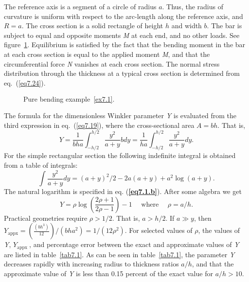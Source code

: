 \documentclass{AeroStructure-ERJohnson}
\begin{document}
\begin{example}\label{ex7.1}The reference axis is a segment of a circle of radius $a$. Thus, the radius of curvature is uniform with respect to the arc-length along the reference axis, and $R=a$. The cross section is a solid rectangle of height $h$ and width $b$. The bar is subject to equal and opposite moments \textit{M} at each end, and no other loads. See figure~\ref{fig7.3}. Equilibrium is satisfied by the fact that the bending moment in the bar at each cross section is equal to the applied moment \textit{M}, and that the circumferential force \textit{N} vanishes at each cross section. The normal stress distribution through the thickness at a typical cross section is determined from eq.~(\ref{eq7.24}).

{\def\thefigure{7.3}
\begin{figure}[h]
\caption{Pure bending example~\ref{ex7.1}.\label{fig7.3}}
\end{figure}}
\vspace*{-1\baselineskip}


The formula for the dimensionless Winkler parameter \textit{Y} is evaluated from the third expression in eq.~(\ref{eq7.19}), where the cross-sectional area $A=bh$. That is,
\begin{equation}
Y=\frac{1}{b h a} \int_{-h / 2}^{h / 2} \frac{y^{2}}{a+y} b d y=\frac{1}{h a} \int_{-h / 2}^{h / 2} \frac{y^{2}}{a+y} d y. \label{eq7.1.a}\tag{a}
\end{equation}
For the simple rectangular section the following indefinite integral is obtained from a table of integrals:
\begin{equation}
\int \frac{y^{2}}{a+y} d y=(a+y)^{2} / 2-2 a(a+y)+a^{2} \log (a+y). \label{eq7.1.b}\tag{b}
\end{equation}
The natural logarithm is specified in eq. (\textbf{\ref{eq7.1.b}}). After some algebra we get
\begin{equation}
Y=\rho \log \left(\frac{2 \rho+1}{2 \rho-1}\right)-1 \quad \text { where } \quad \rho=a / h. \label{eq7.1.c}\tag{c}
\end{equation}
Practical geometries require $\rho>1 / 2$. That is, $a>h/2$. If $a \gg y$, then $Y_{\mathrm{appx}}=\left(\frac{\left(b h^{3}\right)}{12}\right) /\left(b h a^{2}\right)=1 /\left(12 \rho^{2}\right)$. For selected values of $\rho$, the values of \textit{Y}, $Y_{\text {appx }}$, and percentage error between the exact and approximate values of \textit{Y }are listed in table~\ref{tab7.1}. As can be seen in table~\ref{tab7.1}, the parameter \textit{Y} decreases rapidly with increasing radius to thickness ratios $a / h$, and that the approximate value of \textit{Y} is less than 0.15 percent of the exact value for $a / h>10$.


\end{example}
\end{document}
